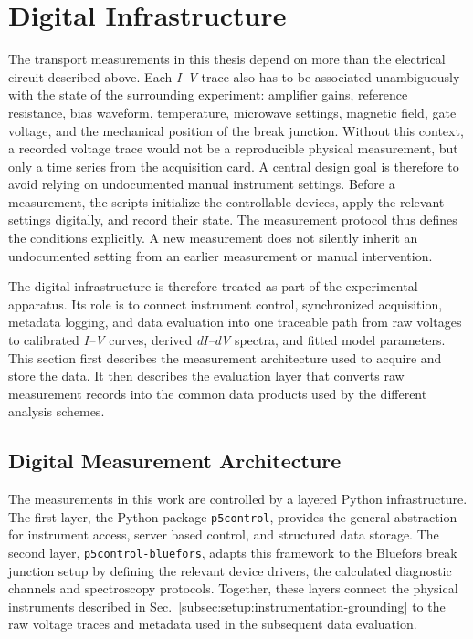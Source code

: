 \newpage
\section{Digital Infrastructure}
\label{sec:methods:digital}

    The transport measurements in this thesis depend on more than the electrical circuit described above. Each \textit{I--V} trace also has to be associated unambiguously with the state of the surrounding experiment: amplifier gains, reference resistance, bias waveform, temperature, microwave settings, magnetic field, gate voltage, and the mechanical position of the break junction. Without this context, a recorded voltage trace would not be a reproducible physical measurement, but only a time series from the acquisition card. A central design goal is therefore to avoid relying on undocumented manual instrument settings. Before a measurement, the scripts initialize the controllable devices, apply the relevant settings digitally, and record their state. The measurement protocol thus defines the conditions explicitly. A new measurement does not silently inherit an undocumented setting from an earlier measurement or manual intervention.

    The digital infrastructure is therefore treated as part of the experimental apparatus. Its role is to connect instrument control, synchronized acquisition, metadata logging, and data evaluation into one traceable path from raw voltages to calibrated \textit{I--V} curves, derived \textit{dI--dV} spectra, and fitted model parameters. This section first describes the measurement architecture used to acquire and store the data. It then describes the evaluation layer that converts raw measurement records into the common data products used by the different analysis schemes.

    \subsection{Digital Measurement Architecture}
    \label{subsec:methods:digital:architecture}

        The measurements in this work are controlled by a layered Python infrastructure. The first layer, the Python package \texttt{p5control}, provides the general abstraction for instrument access, server based control, and structured data storage. The second layer, \texttt{p5control-bluefors}, adapts this framework to the Bluefors break junction setup by defining the relevant device drivers, the calculated diagnostic channels and spectroscopy protocols. Together, these layers connect the physical instruments described in Sec.~\ref{subsec:setup:instrumentation-grounding} to the raw voltage traces and metadata used in the subsequent data evaluation.

